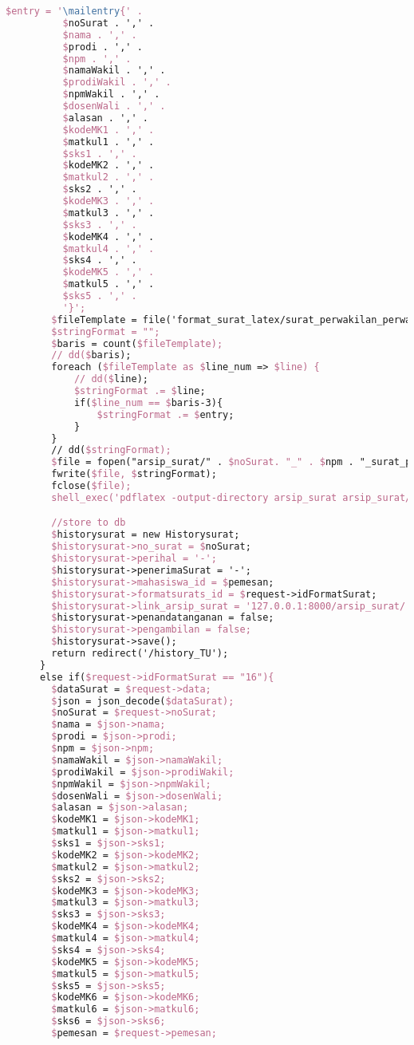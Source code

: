 \begin{lstlisting}[language=tex,basicstyle=\tiny,caption=HistorysuratController.php]
        $entry = '\mailentry{' .
          $noSurat . ',' .
          $nama . ',' .
          $prodi . ',' .
          $npm . ',' .
          $namaWakil . ',' .
          $prodiWakil . ',' .
          $npmWakil . ',' .
          $dosenWali . ',' .
          $alasan . ',' .
          $kodeMK1 . ',' .
          $matkul1 . ',' .
          $sks1 . ',' .
          $kodeMK2 . ',' .
          $matkul2 . ',' .
          $sks2 . ',' .
          $kodeMK3 . ',' .
          $matkul3 . ',' .
          $sks3 . ',' .
          $kodeMK4 . ',' .
          $matkul4 . ',' .
          $sks4 . ',' .
          $kodeMK5 . ',' .
          $matkul5 . ',' .
          $sks5 . ',' .
          '}';
        $fileTemplate = file('format_surat_latex/surat_perwakilan_perwalian_5mk.tex');
        $stringFormat = "";
        $baris = count($fileTemplate);
        // dd($baris);
        foreach ($fileTemplate as $line_num => $line) {
            // dd($line);
            $stringFormat .= $line;
            if($line_num == $baris-3){
                $stringFormat .= $entry;
            }
        }
        // dd($stringFormat);
        $file = fopen("arsip_surat/" . $noSurat. "_" . $npm . "_surat_perwakilan_perwalian_5mk.tex", "w");
        fwrite($file, $stringFormat);
        fclose($file);
        shell_exec('pdflatex -output-directory arsip_surat arsip_surat/' . $noSurat . '_' . $npm . '_surat_perwakilan_perwalian_5mk.tex');

        //store to db
        $historysurat = new Historysurat;
        $historysurat->no_surat = $noSurat;
        $historysurat->perihal = '-';
        $historysurat->penerimaSurat = '-';
        $historysurat->mahasiswa_id = $pemesan;
        $historysurat->formatsurats_id = $request->idFormatSurat;
        $historysurat->link_arsip_surat = '127.0.0.1:8000/arsip_surat/' . $noSurat. '_' . $npm . '_surat_perwakilan_perwalian_5mk.pdf';
        $historysurat->penandatanganan = false;
        $historysurat->pengambilan = false;
        $historysurat->save();
        return redirect('/history_TU');
      }
      else if($request->idFormatSurat == "16"){
        $dataSurat = $request->data;
        $json = json_decode($dataSurat);
        $noSurat = $request->noSurat;
        $nama = $json->nama;
        $prodi = $json->prodi;
        $npm = $json->npm;
        $namaWakil = $json->namaWakil;
        $prodiWakil = $json->prodiWakil;
        $npmWakil = $json->npmWakil;
        $dosenWali = $json->dosenWali;
        $alasan = $json->alasan;
        $kodeMK1 = $json->kodeMK1;
        $matkul1 = $json->matkul1;
        $sks1 = $json->sks1;
        $kodeMK2 = $json->kodeMK2;
        $matkul2 = $json->matkul2;
        $sks2 = $json->sks2;
        $kodeMK3 = $json->kodeMK3;
        $matkul3 = $json->matkul3;
        $sks3 = $json->sks3;
        $kodeMK4 = $json->kodeMK4;
        $matkul4 = $json->matkul4;
        $sks4 = $json->sks4;
        $kodeMK5 = $json->kodeMK5;
        $matkul5 = $json->matkul5;
        $sks5 = $json->sks5;
        $kodeMK6 = $json->kodeMK6;
        $matkul6 = $json->matkul6;
        $sks6 = $json->sks6;
        $pemesan = $request->pemesan;


\end{lstlisting}
